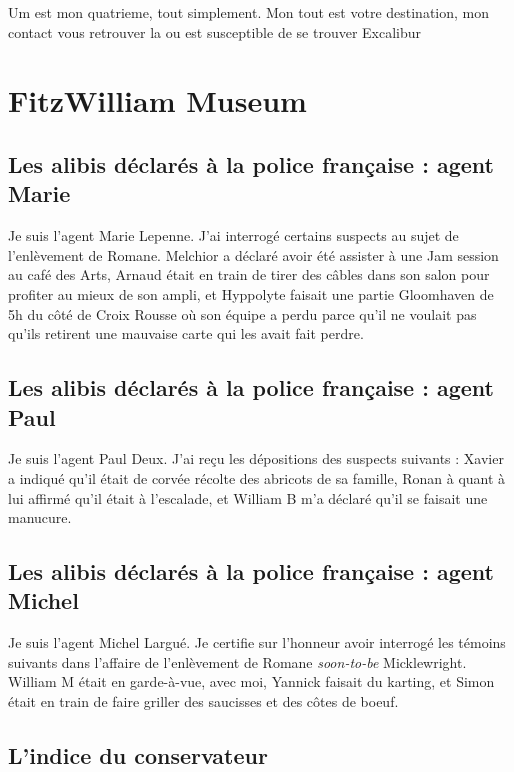 \documentclass[12pt]{article}
\begin{document}
Um est mon quatrieme, tout simplement. Mon tout est votre destination, mon contact vous retrouver la ou est susceptible de se trouver Excalibur

\section{FitzWilliam Museum}

\subsection{Les alibis déclarés à la police française : agent Marie}

Je suis l'agent Marie Lepenne. J'ai interrogé certains suspects au sujet de l'enlèvement de Romane. Melchior a déclaré avoir été assister à une Jam session au café des Arts, Arnaud était en train de tirer des câbles dans son salon pour profiter au mieux de son ampli, et Hyppolyte faisait une partie Gloomhaven de 5h du côté de Croix Rousse où son équipe a perdu parce qu'il ne voulait pas qu'ils retirent une mauvaise carte qui les avait fait perdre.
 
\subsection{Les alibis déclarés à la police française : agent Paul}

Je suis l'agent Paul Deux. J'ai reçu les dépositions des suspects suivants : Xavier a indiqué qu'il était de corvée récolte des abricots de sa famille, Ronan à quant à lui affirmé qu'il était à l'escalade, et William B m'a déclaré qu'il se faisait une manucure. 

\subsection{Les alibis déclarés à la police française : agent Michel}

Je suis l'agent Michel Largué. Je certifie sur l'honneur avoir interrogé les témoins suivants dans l'affaire de l'enlèvement de Romane {\it soon-to-be} Micklewright.  William M était en garde-à-vue, avec moi, Yannick faisait du karting, et Simon était en train de faire griller des saucisses et des côtes de boeuf.

\subsection{L'indice du conservateur}
\end{document}

